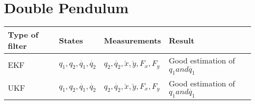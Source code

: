 \documentclass[12pt,a4paper]{article}
\begin{document}
 \section{Double Pendulum}
 \begin{center}
   \begin{tabular}{ p{1cm} | p{3cm} | p{3cm} | p{5cm} }
     \hline
     \textbf{Type of filter} & \textbf{States} & \textbf{Measurements} & \textbf{Result} \\ \hline
           EKF & $q_1,q_2,\dot{q_1},\dot{q_2}$ & $ q_2,\dot{q_2}, \ddot{x}, \ddot{y}, F_x,F_y$ & Good estimation of $q_1 and \dot{q_1}$ \\ \hline
           UKF & $q_1,q_2,\dot{q_1},\dot{q_2}$ & $ q_2,\dot{q_2}, \ddot{x}, \ddot{y},F_x,F_y$ & Good estimation of $q_1 and \dot{q_1}$ \\ \hline
   \end{tabular}
 \end{center}
 
\end{document}
